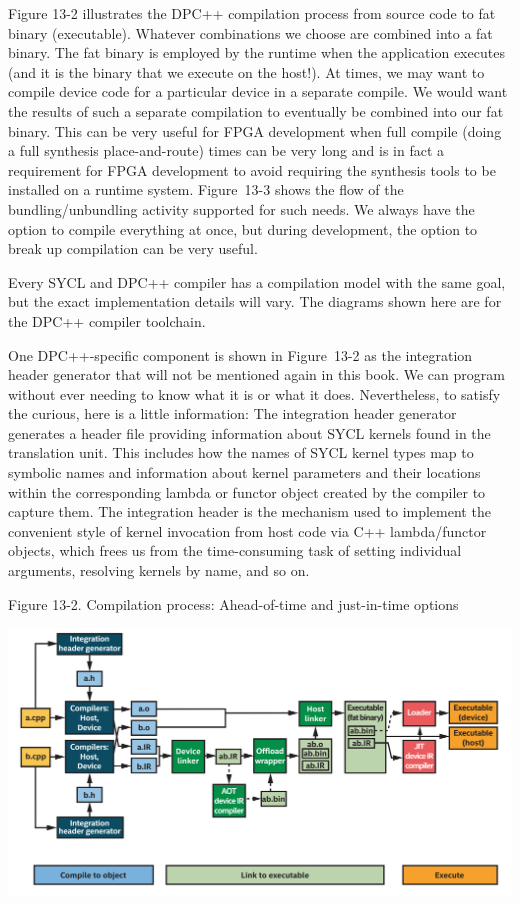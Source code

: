 Figure 13-2 illustrates the DPC++ compilation process from source code to fat binary (executable). Whatever combinations we choose are combined into a fat binary. The fat binary is employed by the runtime when the application executes (and it is the binary that we execute on the host!). At times, we may want to compile device code for a particular device in a separate compile. We would want the results of such a separate compilation to eventually be combined into our fat binary. This can be very useful for FPGA development when full compile (doing a full synthesis place-and-route) times can be very long and is in fact a requirement for FPGA development to avoid requiring the synthesis tools to be installed on a runtime system. Figure 13-3 shows the flow of the bundling/unbundling activity supported for such needs. We always have the option to compile everything at once, but during development, the option to break up compilation can be very useful.\par

Every SYCL and DPC++ compiler has a compilation model with the same goal, but the exact implementation details will vary. The diagrams shown here are for the DPC++ compiler toolchain.\par

One DPC++-specific component is shown in Figure 13-2 as the integration header generator that will not be mentioned again in this book. We can program without ever needing to know what it is or what it does. Nevertheless, to satisfy the curious, here is a little information: The integration header generator generates a header file providing information about SYCL kernels found in the translation unit. This includes how the names of SYCL kernel types map to symbolic names and information about kernel parameters and their locations within the corresponding lambda or functor object created by the compiler to capture them. The integration header is the mechanism used to implement the convenient style of kernel invocation from host code via C++ lambda/functor objects, which frees us from the time-consuming task of setting individual arguments, resolving kernels by name, and so on.\par

\hspace*{\fill} \par %
Figure 13-2. Compilation process: Ahead-of-time and just-in-time options
\begin{center}
	\includegraphics[width=1.\textwidth]{content/chapter-13/images/3}
\end{center}

